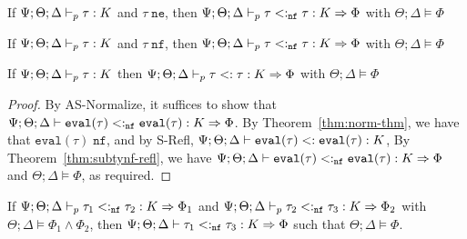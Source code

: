 \begin{theorem}
If $\Psi ; \Theta ;  \Delta \vdash_p \tau : K$ and $\tau \;\texttt{ne}$, then $\Psi ; \Theta ;  \Delta \vdash_p \tau<:_{\texttt{nf}} \tau : K \Rightarrow \Phi$ with $\Theta ; \Delta \vDash \Phi$
\label{thm:subtyne-refl}
\end{theorem}

\begin{theorem}
If $\Psi ; \Theta ;  \Delta \vdash_p \tau : K$ and $\tau \;\texttt{nf}$, then $\Psi ; \Theta ;  \Delta \vdash_p \tau<:_{\texttt{nf}} \tau : K \Rightarrow \Phi$ with $\Theta ; \Delta \vDash \Phi$
\label{thm:subtynf-refl}
\end{theorem}

\begin{theorem}
If $\Psi ; \Theta ;  \Delta \vdash_p \tau : K$ then $\Psi ; \Theta ;  \Delta \vdash_p \tau<: \tau : K \Rightarrow \Phi$ with $\Theta ; \Delta \vDash \Phi$
\label{thm:subty-refl}
\end{theorem}
\begin{proof}
By AS-Normalize, it suffices to show that $\Psi ; \Theta ;  \Delta \vdash \texttt{eval}(\tau) <:_{\texttt{nf}} \texttt{eval}(\tau) : K \Rightarrow \Phi$. By Theorem~\ref{thm:norm-thm}, we have that $\texttt{eval}(\tau) \; \texttt{nf}$, and by S-Refl, $\Psi ; \Theta ; \Delta \vdash \texttt{eval}(\tau) <: \texttt{eval}(\tau) : K$, By Theorem~\ref{thm:subtynf-refl}, we have $\Psi ; \Theta ;  \Delta \vdash \texttt{eval}(\tau) <:_{\texttt{nf}} \texttt{eval}(\tau) : K \Rightarrow \Phi$ and $\Theta ; \Delta \vDash \Phi$, as required. 
\end{proof}

\begin{theorem}
If $\Psi ; \Theta ; \Delta \vdash_p \tau_1 <:_{\texttt{nf}} \tau_2 : K \Rightarrow \Phi_1$ and $\Psi ; \Theta ; \Delta \vdash_p \tau_2 <:_{\texttt{nf}} \tau_3 : K \Rightarrow \Phi_2$ with $\Theta ; \Delta \vDash \Phi_1 \wedge \Phi_2$, then $\Psi ; \Theta ; \Delta \vdash \tau_1 <:_{\texttt{nf}} \tau_3 : K \Rightarrow \Phi$ such that $\Theta ; \Delta \vDash \Phi$.
\label{thm:subtynf-trans}
\end{theorem}

